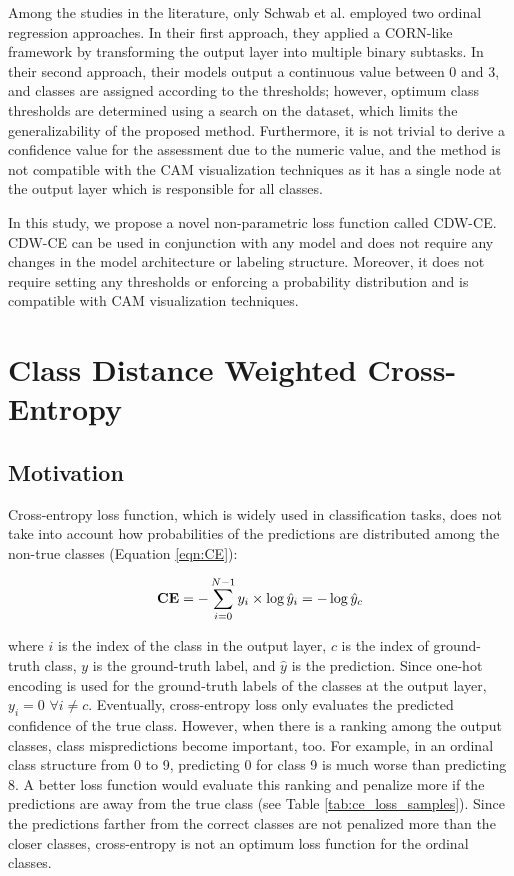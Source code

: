 \documentclass[runningheads]{llncs}
\begin{document}
Among the studies in the literature, only Schwab et al. \cite{schwab2021automatic} employed two ordinal regression approaches. In their first approach, they applied a CORN-like framework by transforming the output layer into multiple binary subtasks. In their second approach, their models output a continuous value between 0 and 3, and classes are assigned according to the thresholds; however, optimum class thresholds are determined using a search on the dataset, which limits the generalizability of the proposed method. Furthermore, it is not trivial to derive a confidence value for the assessment due to the numeric value, and the method is not compatible with the CAM visualization techniques as it has a single node at the output layer which is responsible for all classes.

In this study, we propose a novel non-parametric loss function called CDW-CE. CDW-CE can be used in conjunction with any model and does not require any changes in the model architecture or labeling structure. Moreover, it does not require setting any thresholds or enforcing a probability distribution and is compatible with CAM visualization techniques.

\section{Class Distance Weighted Cross-Entropy}
\subsection{Motivation}

Cross-entropy loss function, which is widely used in classification tasks, does not take into account how probabilities of the predictions are distributed among the non-true classes (Equation \ref{eqn:CE}):



\begin{equation} \label{eqn:CE}
    \textrm{\textbf{CE}}=-\sum_{i=0}^{N-1}{y_i \times \log{\hat{y}_i}}=-\log{\hat{y}_{c}}
\end{equation}

\noindent where $i$ is the index of the class in the output layer, $c$ is the index of ground-truth class, $y$ is the ground-truth label, and $\hat{y}$ is the prediction. Since one-hot encoding is used for the ground-truth labels of the classes at the output layer, $y_i=0$ $\forall i\neq c$. Eventually, cross-entropy loss only evaluates the predicted confidence of the true class. However, when there is a ranking among the output classes, class mispredictions become important, too. For example, in an ordinal class structure from 0 to 9, predicting 0 for class 9 is much worse than predicting 8. A better loss function would evaluate this ranking and penalize more if the predictions are away from the true class (see Table \ref{tab:ce_loss_samples}). Since the predictions farther from the correct classes are not penalized more than the closer classes, cross-entropy is not an optimum loss function for the ordinal classes.
\end{document}
